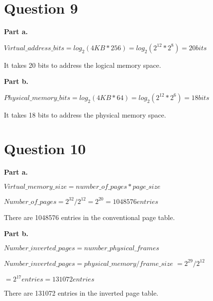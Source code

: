 \documentclass[a4paper]{article}
\begin{document}
	\section{Question 9}
	\par \textbf{Part a.}
	\par $Virtual\_address\_bits = log_{2}(4KB * 256) = log_{2}(2^{12} * 2^{8}) =
	20 bits$
	\par It takes 20 bits to address the logical memory space.
	\par \textbf{Part b.}
	\par $Physical\_memory\_bits = log_{2}(4KB * 64) = log_{2}(2^{12} * 2^{6}) =
	18 bits$
	\par It takes 18 bits to address the physical memory space.

	\section{Question 10}
	\par \textbf{Part a.}
	\par $Virtual\_memory\_size = number\_of\_pages * page\_size$
	\par $Number\_of\_pages = 2^{32} / 2^{12} = 2^{20} = 1048576 entries$
	\par There are 1048576 entries in the conventional page table.
	\par \textbf{Part b.}
	\par $Number\_inverted\_pages = number\_physical\_frames$
	\par $Number\_inverted\_pages = physical\_memory / frame\_size$ $=
	2^{29} / 2^{12}$
	\par $= 2^{17} entries = 131072 entries$
	\par There are 131072 entries in the inverted page table.
\end{document}
